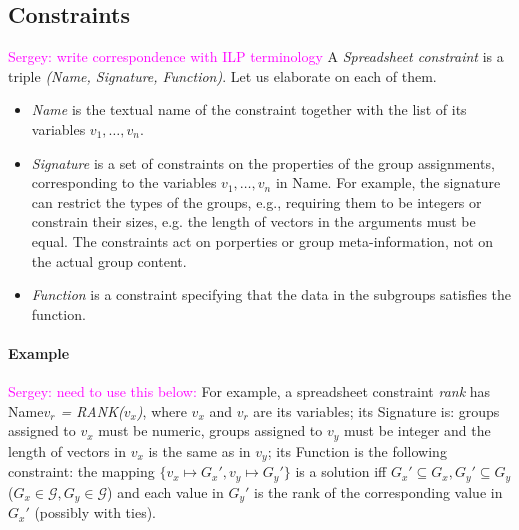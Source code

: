 \documentclass{ecai}
\newcommand{\sergey}[1]{\textcolor{magenta}{{\sc Sergey:} #1}\xspace}
\newcommand{\CName}{Name\xspace}
\newcommand{\CSignature}{Signature\xspace}
\newcommand{\CFunction}{Function\xspace}
\newcommand{\groups}{\ensuremath{\mathcal{G}}\xspace}
\begin{document}
\subsection{Constraints}
\sergey{write correspondence with ILP terminology}
A \textit{Spreadsheet constraint} is a triple \textit{(\CName, \CSignature, \CFunction)}.
Let us elaborate on each of them. 
\begin{itemize}
\item
\textit{\CName} is the textual name of the constraint together with the list of its variables $v_1,\dots,v_n$.
\item
  \textit{\CSignature} is a set of constraints on the properties of the group assignments, corresponding to the variables $v_1,\dots,v_n$ in \CName.
  For example, the signature can restrict the types of the groups, e.g., requiring them to be integers or constrain their sizes, e.g. the length of vectors in the arguments must be equal.
  The constraints act on porperties or group meta-information, not on the actual group content. 
\item \textit{\CFunction} is a constraint specifying that the data in the subgroups satisfies the function.
  \end{itemize}

\paragraph{Example}
\sergey{need to use this below:}
  For example, a spreadsheet constraint \textit{rank} has \CName \textit{$v_r$ = RANK($v_x$)}, where $v_x$ and $v_r$ are its variables; its \CSignature is: groups assigned to $v_x$ must be numeric, groups assigned to $v_y$ must be integer and the length of vectors in $v_x$ is the same as in $v_y$; its \CFunction is the following constraint: the mapping $\{ v_x \mapsto G_x', v_y \mapsto G_y' \}$ is a solution iff $G_x' \subseteq G_x, G_y' \subseteq G_y$ ($G_x \in \groups, G_y \in \groups$) and each value in $G_y'$ is the rank of the corresponding value in $G_x'$ (possibly with ties).

\end{document}
